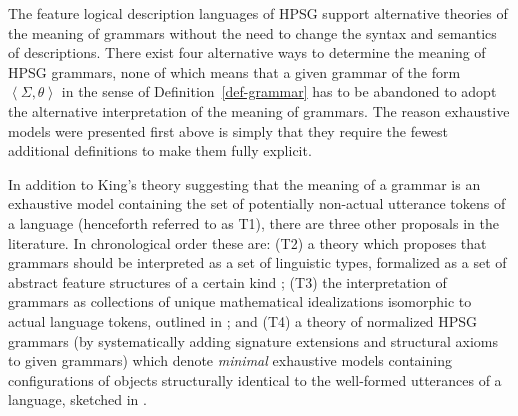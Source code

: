 \documentclass[output=paper
                ,modfonts
                ,nonflat
	        ,collection
	        ,collectionchapter
	        ,collectiontoclongg
 	        ,biblatex
                ,babelshorthands
                ,newtxmath
                ,draftmode
                ,colorlinks, citecolor=brown
]{./langsci/langscibook}
\begin{document}
{The feature logical description languages of HPSG support alternative
theories of the meaning of grammars without the need to change the
syntax and semantics of descriptions. There exist four
alternative ways to determine the meaning of HPSG grammars, none of
which means that a given grammar of the form $\left< \Sigma, \theta
\right>$ in the sense of Definition~\ref{def-grammar} has to be
abandoned to adopt the alternative interpretation of the meaning of
grammars. The reason exhaustive models were presented first above is
simply that they require the fewest additional definitions to make them
fully explicit.

In addition to King's theory suggesting that the meaning of a grammar
is an exhaustive model containing the set of potentially non-actual
utterance tokens of a language (henceforth referred to as T1), there
are three other proposals in the literature. In chronological order
these are: (T2) a theory which proposes that grammars should be
interpreted as a set of linguistic types, formalized as a set of
abstract feature structures of a certain kind \citep{PollardSag1994};
(T3) the interpretation of grammars as collections of unique
mathematical idealizations isomorphic to actual language tokens,
outlined in \cite{Pollard99a}; and (T4) a theory of normalized HPSG
grammars (by systematically adding signature extensions and structural
axioms to given grammars) which denote \emph{minimal} exhaustive
models containing configurations of objects structurally identical to
the well-formed utterances of a language, sketched in
\cite{Richter2007a}.

}
\end{document}
